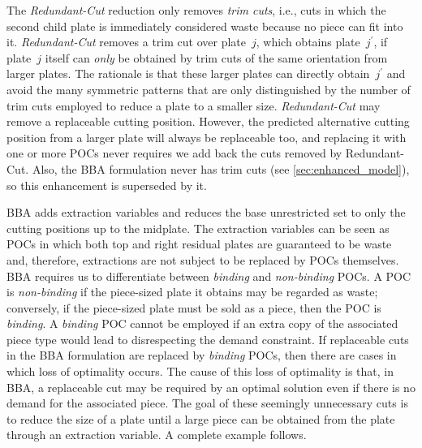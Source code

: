 \documentclass[ppgc,tese,english,formais,babel]{iiufrgs}
\begin{document}
The \emph{Redundant-Cut} reduction only removes \emph{trim cuts}, i.e., cuts in which the second child plate is immediately considered waste because no piece can fit into it.
\emph{Redundant-Cut} removes a trim cut over plate~\(j\), which obtains plate~\(j^\prime\), if plate~\(j\) itself can \emph{only} be obtained by trim cuts of the same orientation from larger plates. The rationale is that these larger plates can directly obtain~\(j^\prime\) and avoid the many symmetric patterns that are only distinguished by the number of trim cuts employed to reduce a plate to a smaller size.
\emph{Redundant-Cut} may remove a replaceable cutting position. However, the predicted alternative cutting position from a larger plate will always be replaceable too, and replacing it with one or more POCs never requires we add back the cuts removed by Redundant-Cut.
Also, the BBA formulation never has trim cuts (see \cref{sec:enhanced_model}), so this enhancement is superseded by it.

BBA adds extraction variables and reduces the base unrestricted set to only the cutting positions up to the midplate.
The extraction variables can be seen as POCs in which both top and right residual plates are guaranteed to be waste and, therefore, extractions are not subject to be replaced by POCs themselves.
BBA requires us to differentiate between \emph{binding} and \emph{non-binding} POCs.
A POC is \emph{non-binding} if the piece-sized plate it obtains may be regarded as waste; conversely, if the piece-sized plate must be sold as a piece, then the POC is \emph{binding}.
A \emph{binding} POC cannot be employed if an extra copy of the associated piece type would lead to disrespecting the demand constraint.
If replaceable cuts in the BBA formulation are replaced by \emph{binding} POCs, then there are cases in which loss of optimality occurs.
The cause of this loss of optimality is that, in BBA, a replaceable cut may be required by an optimal solution even if there is no demand for the associated piece.
The goal of these seemingly unnecessary cuts is to reduce the size of a plate until a large piece can be obtained from the plate through an extraction variable.
A complete example follows.
\end{document}
